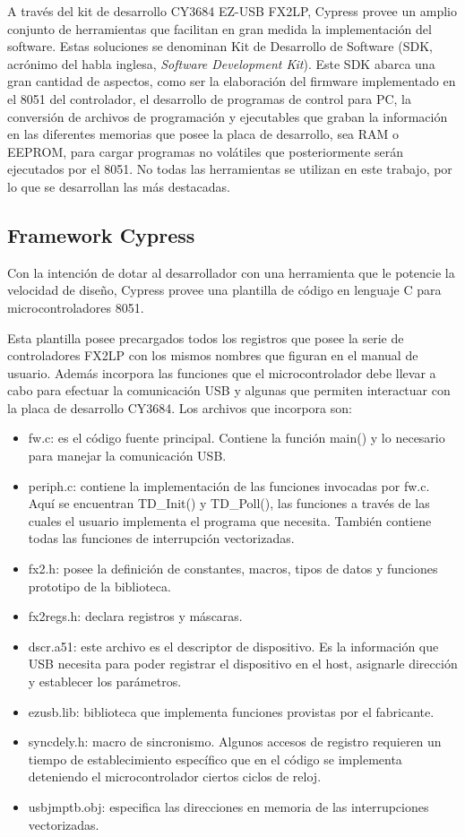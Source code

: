 A través del kit de desarrollo CY3684 EZ-USB FX2LP, Cypress provee un amplio conjunto de herramientas que facilitan en gran medida la implementación del software. Estas soluciones se denominan Kit de Desarrollo de Software (SDK, acrónimo del habla inglesa, {\it Software Development Kit}). Este SDK abarca una gran cantidad de aspectos, como ser la elaboración del firmware implementado en el 8051 del controlador, el desarrollo de programas de control para PC, la conversión de archivos de programación y ejecutables que graban la información en las diferentes memorias que posee la placa de desarrollo, sea RAM o EEPROM, para cargar programas no volátiles que posteriormente serán ejecutados por el 8051. No todas las herramientas se utilizan en este trabajo, por lo que se desarrollan las más destacadas.

\subsection{Framework Cypress}
	Con la intención de dotar al desarrollador con una herramienta que le potencie la velocidad de diseño, Cypress provee una plantilla de código en lenguaje C para microcontroladores 8051.%
	
	Esta plantilla posee precargados todos los registros que posee la serie de controladores FX2LP con los mismos nombres que figuran en el manual de usuario. Además incorpora las funciones que el microcontrolador debe llevar a cabo para efectuar la comunicación USB y algunas que permiten interactuar con la placa de desarrollo CY3684. Los archivos que incorpora son:
	
	\begin{itemize}
		\item fw.c: es el código fuente principal. Contiene la función main() y lo necesario para manejar la comunicación USB.
		\item periph.c: contiene la implementación de las funciones invocadas por fw.c. Aquí se encuentran TD\_Init() y TD\_Poll(), las funciones a través de las cuales el usuario implementa el programa que necesita. También contiene todas las funciones de interrupción vectorizadas.
		\item fx2.h: posee la definición de constantes, macros, tipos de datos y funciones prototipo de la biblioteca.
		\item fx2regs.h: declara registros y máscaras.
		\item dscr.a51: este archivo es el descriptor de dispositivo. Es la información que USB necesita para poder registrar el dispositivo en el host, asignarle dirección y establecer los parámetros.
		\item ezusb.lib: biblioteca que implementa funciones provistas por el fabricante.
		\item syncdely.h: macro de sincronismo. Algunos accesos de registro requieren un tiempo de establecimiento específico que en el código se implementa deteniendo el microcontrolador ciertos ciclos de reloj.
		\item usbjmptb.obj: especifica las direcciones en memoria de las interrupciones vectorizadas.
	\end{itemize}
	
